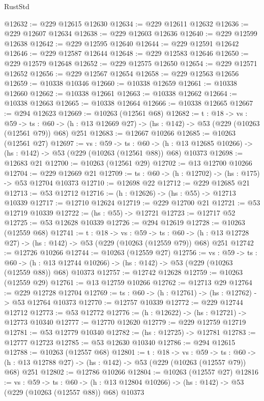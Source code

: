 \begin{lexlean}{RustStd}
\begin{coremodule}
@12632 := @229 @12615 @12630
@12634 := @229 @12611 @12632
@12636 := @229 @12607 @12634
@12638 := @229 @12603 @12636
@12640 := @229 @12599 @12638
@12642 := @229 @12595 @12640
@12644 := @229 @12591 @12642
@12646 := @229 @12587 @12644
@12648 := @229 @12583 @12646
@12650 := @229 @12579 @12648
@12652 := @229 @12575 @12650
@12654 := @229 @12571 @12652
@12656 := @229 @12567 @12654
@12658 := @229 @12563 @12656
@12659 := @10338 @10346
@12660 := @10338 @12659
@12661 := @10338 @12660
@12662 := @10338 @12661
@12663 := @10338 @12662
@12664 := @10338 @12663
@12665 := @10338 @12664
@12666 := @10338 @12665
@12667 := @294 @12623
@12669 := @10263 (@12561 @68)
@12682 := {t : @18} ->
  {vs : @59} ->
  {ts : @60} -> (h : @13 @12669 @27) -> (hs : @142) -> @53 (@229 (@10263 (@12561 @79)) @68) @251
@12683 := @12667 @10266
@12685 := @10263 (@12561 @27)
@12697 := {vs : @59} ->
  {ts : @60} ->
  (h : @13 @12685 @10266) -> (hs : @142) -> @53 (@229 (@10263 (@12561 @88)) @68) @10373
@12698 := @12683 @21
@12700 := @10263 (@12561 @29)
@12702 := @13 @12700 @10266
@12704 := @229 @12669 @21
@12709 := {ts : @60} -> (h : @12702) -> (hs : @175) -> @53 @12704 @10373
@12710 := @12698 @22
@12712 := @229 @12685 @21
@12713 := @53 @12712
@12716 := (h : @12626) -> (hs : @55) -> @12713 @10339
@12717 := @12710 @12624
@12719 := @229 @12700 @21
@12721 := @53 @12719 @10339
@12722 := (hs : @55) -> @12721
@12723 := @12717 @52
@12725 := @53 @12628 @10339
@12726 := @294 @12619
@12728 := @10263 (@12559 @68)
@12741 := {t : @18} ->
  {vs : @59} ->
  {ts : @60} -> (h : @13 @12728 @27) -> (hs : @142) -> @53 (@229 (@10263 (@12559 @79)) @68) @251
@12742 := @12726 @10266
@12744 := @10263 (@12559 @27)
@12756 := {vs : @59} ->
  {ts : @60} ->
  (h : @13 @12744 @10266) -> (hs : @142) -> @53 (@229 (@10263 (@12559 @88)) @68) @10373
@12757 := @12742 @12628
@12759 := @10263 (@12559 @29)
@12761 := @13 @12759 @10266
@12762 := @12713 @29
@12764 := @229 @12728 @12704
@12769 := {ts : @60} -> (h : @12761) -> (hs : @12762) -> @53 @12764 @10373
@12770 := @12757 @10339
@12772 := @229 @12744 @12712
@12773 := @53 @12772
@12776 := (h : @12622) -> (hs : @12721) -> @12773 @10340
@12777 := @12770 @12620
@12779 := @229 @12759 @12719
@12781 := @53 @12779 @10340
@12782 := (hs : @12725) -> @12781
@12783 := @12777 @12723
@12785 := @53 @12630 @10340
@12786 := @294 @12615
@12788 := @10263 (@12557 @68)
@12801 := {t : @18} ->
  {vs : @59} ->
  {ts : @60} -> (h : @13 @12788 @27) -> (hs : @142) -> @53 (@229 (@10263 (@12557 @79)) @68) @251
@12802 := @12786 @10266
@12804 := @10263 (@12557 @27)
@12816 := {vs : @59} ->
  {ts : @60} ->
  (h : @13 @12804 @10266) -> (hs : @142) -> @53 (@229 (@10263 (@12557 @88)) @68) @10373

\end{coremodule}
\end{lexlean}
